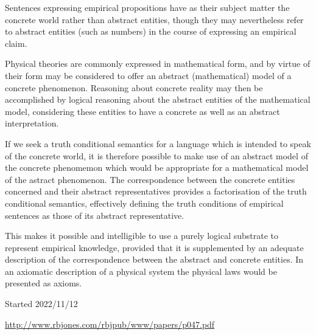 \documentclass[10pt,titlepage]{article}
\newcommand{\ignore}[1]{}
\begin{document}
Sentences expressing empirical propositions have as their subject matter the concrete world rather than abstract entities, though they may nevertheless refer to abstract entities (such as numbers) in the course of expressing an empirical claim.

Physical theories are commonly expressed in mathematical form, and by virtue of their form may be considered to offer an abstract (mathematical) model of a concrete phenomenon.
Reasoning about concrete reality may then be accomplished by logical reasoning about the abstract entities of the mathematical model, considering these entities to have a concrete as well as an abstract interpretation.

If we seek a truth conditional semantics for a language which is intended to speak of the concrete world, it is therefore possible to make use of an abstract model of the concrete phenomemon which would be appropriate for a mathematical model of the astract phenomenon.
The correspondence between the concrete entities concerned and their abstract representatives provides a factorisation of the truth conditional semantics, effectively defining the truth conditions of empirical sentences as those of its abstract representative.

This makes it possible and intelligible to use a purely logical substrate to represent empirical knowledge, provided that it is supplemented by an adequate description of the correspondence between the abstract and concrete entities.
In an axiomatic description of a physical system the physical laws would be presented as axioms.






\ignore{
\begin{quote}
``Matters of fact, which are the second objects of human reason, are not ascertained in the same manner; nor is our evidence of their truth, however great, of a like nature with the foregoing. The contrary of every matter of fact is still possible; because it can never imply a contradiction, and is conceived by the mind with the same facility and distinctness, as if ever so conformable to reality. That the sun will not rise to-morrow is no less intelligible a proposition, and implies no more contradiction than the affirmation, that it will rise. We should in vain, therefore, attempt to demonstrate its falsehood. Were it demonstratively false, it would imply a contradiction, and could never be distinctly conceived by the mind.''
\end{quote}
}%

\appendix
\pagebreak
{}
{}



\label{index}
{\twocolumn[]
{\small\printindex}}

\vfill

\tiny{
Started 2022/11/12


\href{http://www.rbjones.com/rbjpub/www/papers/p047.pdf}{http://www.rbjones.com/rbjpub/www/papers/p047.pdf}

}%
\end{document}
